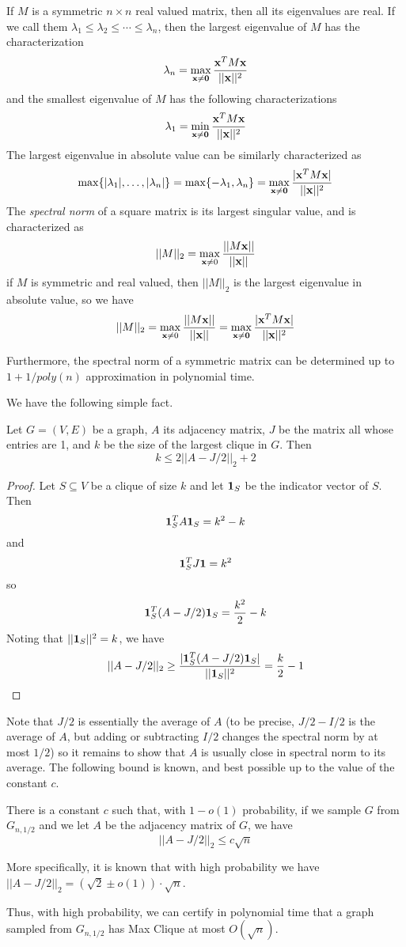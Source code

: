 If $M$ is a symmetric $n\times n$ real valued matrix, then all its eigenvalues are real. If we call
them $\lambda_1 \leq \lambda_2 \leq \cdots \leq \lambda_n$, then the  largest eigenvalue of $M$ has the  characterization
\[ \lambda_n = \max_{{\bf x} \neq {\bf 0}} \frac {{\bf x}^T M {\bf x}}{|| {\bf x}||^2} \]
and the smallest eigenvalue of $M$ has the following characterizations
\[\lambda_1 = \min_{{\bf x} \neq {\bf 0}} \frac {{\bf x}^T M {\bf x}}{|| {\bf x}||^2} \]
The largest eigenvalue in absolute value can be similarly characterized as
\[ \max \{ | \lambda_1 | , \ldots , |\lambda_n | \} = \max \{ -\lambda_1 , \lambda_n \} =
\max_{{\bf x} \neq {\bf 0}} \frac {|{\bf x}^T M {\bf x}|}{|| {\bf x}||^2} \]
The {\em spectral norm} of a square matrix is its largest singular value, and is characterized as
\[ || M ||_2 = \max_{{\bf x} \neq 0} \frac {|| M {\bf x}||}{||{\bf x}||} \]
if $M$ is symmetric and real valued, then $||M||_2$ is the largest eigenvalue in absolute value, so we have
\[  || M ||_2 = \max_{{\bf x} \neq 0} \frac {|| M {\bf x}||}{||{\bf x}||} = \max_{{\bf x} \neq {\bf 0}} \frac {|{\bf x}^T M {\bf x}|}{|| {\bf x}||^2} \]

Furthermore, the spectral norm of a symmetric matrix can be determined up to $1 + 1/poly(n)$ approximation in polynomial time.

We have the following simple fact.

\begin{lemma} Let $G= (V,E)$ be a graph, $A$ its adjacency matrix, $J$ be the matrix all whose entries are 1, and $k$ be the size of the largest clique in $G$. Then
\[ k\leq 2 || A - J/2||_2  + 2\]
\end{lemma}

\begin{proof} Let $S\subseteq V$ be a clique of size $k$ and let ${\bf 1}_S$ be the indicator vector of $S$. Then
\[ {\bf 1}^T_S A {\bf 1}_S = k^2 - k \]
and
\[ {\bf 1}^T_S J {\bf 1} = k^2 \]
so
\[ {\bf 1}^T_S (A - J/2) {\bf 1} _S= \frac {k^2} 2 -  k \]
Noting that $|| {\bf 1}_S ||^2 = k$, we have
\[ || A - J/2 || _2 \geq \frac {| {\bf 1}^T_S (A - J/2) {\bf 1}_S | }{||{\bf 1}_S||^2 } = \frac k2 - 1 \]
\end{proof}

Note that $J/2$ is essentially the average of $A$ (to be precise, $J/2 - I/2$ is the average of $A$, but adding or subtracting $I/2$ changes the spectral norm by at most $1/2$) so it remains to show that $A$ is usually close in spectral norm to its average. The following bound is known, and best possible up to the value of the constant $c$.

\begin{lemma} There is a constant $c$ such that, with $1-o(1)$ probability, if we sample $G$ from $G_{n,1/2}$ and we let $A$ be the adjacency matrix of $G$, we have
\[ || A - J/2 ||_2 \leq c \sqrt n \]
\end{lemma}

More specifically, it is known that with high probability we have $||A- J/2 ||_2 = (\sqrt 2 \pm o(1)) \cdot \sqrt n$.

Thus, with high probability, we can certify in polynomial time that a graph sampled from $G_{n,1/2}$ has Max Clique at most $O(\sqrt n)$.

